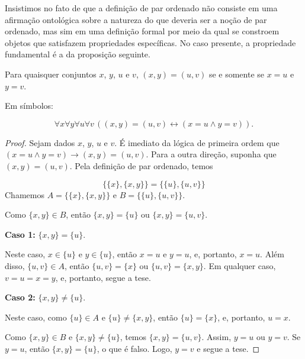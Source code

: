Insistimos no fato de que a definição de par ordenado não consiste em uma afirmação ontológica sobre a natureza do que deveria ser a noção de par ordenado, mas sim em uma definição formal por meio da qual se constroem objetos que satisfazem propriedades específicas.
No caso presente, a propriedade fundamental é a da proposição seguinte.
\begin{proposition}[$\BST$]\label{prop:propriedadeDoParOrdenado}
    Para quaisquer conjuntos $x$, $y$, $u$ e $v$, $(x, y) = (u, v)$ se e somente se $x = u$ e $y = v$.

    Em símbolos:

    \[
        \forall x \forall y \forall u \forall v\, ((x, y) = (u, v) \leftrightarrow (x = u \land y = v)).
    \]
\end{proposition}
\begin{proof}
    Sejam dados $x$, $y$, $u$ e $v$.
    É imediato da lógica de primeira ordem que $(x = u \land y = v) \rightarrow (x, y) = (u, v)$.
    Para a outra direção, suponha que $(x, y) = (u, v)$.
    Pela definição de par ordenado, temos

    \[
    \{\{x\}, \{x, y\}\} = \{\{u\}, \{u, v\}\}
    \]
    Chamemos $A = \{\{x\}, \{x, y\}\}$ e $B = \{\{u\}, \{u, v\}\}$.

    Como $\{x, y\} \in B$, então $\{x, y\} = \{u\}$ ou $\{x, y\} = \{u, v\}$.

    \textbf{Caso 1:} $\{x, y\} = \{u\}$.

    Neste caso, $x \in \{u\}$ e $y \in \{u\}$, então $x = u$ e $y = u$, e, portanto, $x = u$.
    Além disso, $\{u, v\} \in A$, então $\{u, v\} = \{x\}$ ou $\{u, v\} = \{x, y\}$.
    Em qualquer caso, $v = u = x = y$, e, portanto, segue a tese.


    \textbf{Caso 2:} $\{x, y\} \neq \{u\}$.

    Neste caso, como $\{u\} \in A$ e $\{u\} \neq \{x, y\}$, então $\{u\} = \{x\}$, e, portanto, $u = x$.
    
    Como $\{x, y\} \in B$ e $\{x, y\} \neq \{u\}$, temos $\{x, y\} = \{u, v\}$.
    Assim, $y = u$ ou $y = v$.
    Se $y = u$, então $\{x, y\} = \{u\}$, o que é falso.
    Logo, $y = v$ e segue a tese.
\end{proof}

